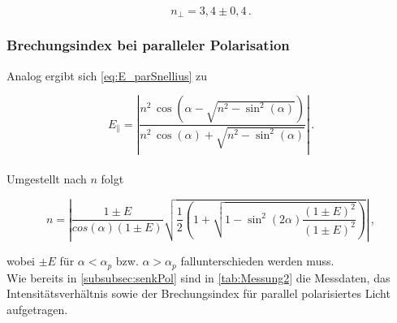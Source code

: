   \begin{equation*}
      n_\perp = 3,4 \pm 0,4 \,. 
  \end{equation*}

\subsubsection{Brechungsindex bei paralleler Polarisation}

Analog ergibt sich \eqref{eq:E_parSnellius} zu

\begin{equation*}
    E_\parallel = \left| \frac{n^2 \, \cos(\alpha - \sqrt{n^2 - \sin^2(\alpha)})}{n^2 \, \cos(\alpha) + \sqrt{n^2 - \sin^2(\alpha)}} \right| \,.
\end{equation*} \\

Umgestellt nach $n$ folgt

\begin{equation*}
    n  = \left| \frac{1 \pm E}{cos(\alpha) (1 \pm E)} \sqrt{\frac{1}{2} 
    \left(1 + \sqrt{1 - \sin^2(2 \alpha) \frac{(1 \pm E)^2}{(1 \pm E)^2}} \right)} \right| \,,
\end{equation*}

wobei $\pm E$ für $\alpha < \alpha_p$ bzw. $\alpha > \alpha_p$ fallunterschieden werden muss. \\

Wie bereits in \autoref{subsubsec:senkPol} sind in \autoref{tab:Messung2} die Messdaten, das Intensitätsverhältnis sowie der Brechungsindex für parallel polarisiertes Licht aufgetragen.

